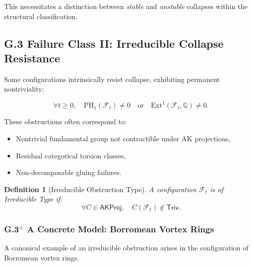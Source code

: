 \documentclass[11pt]{article}
\newtheorem{definition}[theorem]{Definition}
\begin{document}
This necessitates a distinction between \emph{stable} and \emph{unstable} collapses within the structural classification.



\subsection{G.3 Failure Class II: Irreducible Collapse Resistance}

Some configurations intrinsically resist collapse, exhibiting permanent nontriviality:

\[
\forall t \geq 0, \quad \mathrm{PH}_1(\mathcal{F}_t) \neq 0 \quad \text{or} \quad \mathrm{Ext}^1(\mathcal{F}_t, \mathbb{Q}) \neq 0.
\]

These obstructions often correspond to:

\begin{itemize}
  \item Nontrivial fundamental group not contractible under AK projections,
  \item Residual categorical torsion classes,
  \item Non-decomposable gluing failures.
\end{itemize}

\begin{definition}[Irreducible Obstruction Type]
A configuration $\mathcal{F}_t$ is of \emph{Irreducible Type} if:
\[
\forall C \in \mathsf{AKProj}, \quad C(\mathcal{F}_t) \notin \mathsf{Triv}.
\]
\end{definition}

\subsubsection*{G.3$^{+}$ A Concrete Model: Borromean Vortex Rings}

A canonical example of an irreducible obstruction arises in the configuration of Borromean vortex rings.
\end{document}
